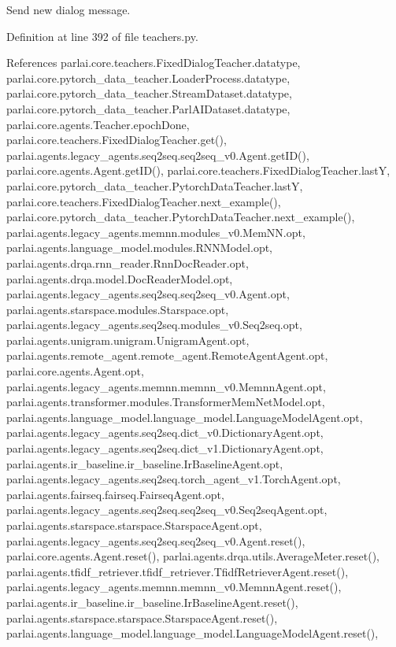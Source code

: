 \begin{DoxyVerb}Send new dialog message.\end{DoxyVerb}
 

Definition at line 392 of file teachers.\+py.



References parlai.\+core.\+teachers.\+Fixed\+Dialog\+Teacher.\+datatype, parlai.\+core.\+pytorch\+\_\+data\+\_\+teacher.\+Loader\+Process.\+datatype, parlai.\+core.\+pytorch\+\_\+data\+\_\+teacher.\+Stream\+Dataset.\+datatype, parlai.\+core.\+pytorch\+\_\+data\+\_\+teacher.\+Parl\+A\+I\+Dataset.\+datatype, parlai.\+core.\+agents.\+Teacher.\+epoch\+Done, parlai.\+core.\+teachers.\+Fixed\+Dialog\+Teacher.\+get(), parlai.\+agents.\+legacy\+\_\+agents.\+seq2seq.\+seq2seq\+\_\+v0.\+Agent.\+get\+I\+D(), parlai.\+core.\+agents.\+Agent.\+get\+I\+D(), parlai.\+core.\+teachers.\+Fixed\+Dialog\+Teacher.\+lastY, parlai.\+core.\+pytorch\+\_\+data\+\_\+teacher.\+Pytorch\+Data\+Teacher.\+lastY, parlai.\+core.\+teachers.\+Fixed\+Dialog\+Teacher.\+next\+\_\+example(), parlai.\+core.\+pytorch\+\_\+data\+\_\+teacher.\+Pytorch\+Data\+Teacher.\+next\+\_\+example(), parlai.\+agents.\+legacy\+\_\+agents.\+memnn.\+modules\+\_\+v0.\+Mem\+N\+N.\+opt, parlai.\+agents.\+language\+\_\+model.\+modules.\+R\+N\+N\+Model.\+opt, parlai.\+agents.\+drqa.\+rnn\+\_\+reader.\+Rnn\+Doc\+Reader.\+opt, parlai.\+agents.\+drqa.\+model.\+Doc\+Reader\+Model.\+opt, parlai.\+agents.\+legacy\+\_\+agents.\+seq2seq.\+seq2seq\+\_\+v0.\+Agent.\+opt, parlai.\+agents.\+starspace.\+modules.\+Starspace.\+opt, parlai.\+agents.\+legacy\+\_\+agents.\+seq2seq.\+modules\+\_\+v0.\+Seq2seq.\+opt, parlai.\+agents.\+unigram.\+unigram.\+Unigram\+Agent.\+opt, parlai.\+agents.\+remote\+\_\+agent.\+remote\+\_\+agent.\+Remote\+Agent\+Agent.\+opt, parlai.\+core.\+agents.\+Agent.\+opt, parlai.\+agents.\+legacy\+\_\+agents.\+memnn.\+memnn\+\_\+v0.\+Memnn\+Agent.\+opt, parlai.\+agents.\+transformer.\+modules.\+Transformer\+Mem\+Net\+Model.\+opt, parlai.\+agents.\+language\+\_\+model.\+language\+\_\+model.\+Language\+Model\+Agent.\+opt, parlai.\+agents.\+legacy\+\_\+agents.\+seq2seq.\+dict\+\_\+v0.\+Dictionary\+Agent.\+opt, parlai.\+agents.\+legacy\+\_\+agents.\+seq2seq.\+dict\+\_\+v1.\+Dictionary\+Agent.\+opt, parlai.\+agents.\+ir\+\_\+baseline.\+ir\+\_\+baseline.\+Ir\+Baseline\+Agent.\+opt, parlai.\+agents.\+legacy\+\_\+agents.\+seq2seq.\+torch\+\_\+agent\+\_\+v1.\+Torch\+Agent.\+opt, parlai.\+agents.\+fairseq.\+fairseq.\+Fairseq\+Agent.\+opt, parlai.\+agents.\+legacy\+\_\+agents.\+seq2seq.\+seq2seq\+\_\+v0.\+Seq2seq\+Agent.\+opt, parlai.\+agents.\+starspace.\+starspace.\+Starspace\+Agent.\+opt, parlai.\+agents.\+legacy\+\_\+agents.\+seq2seq.\+seq2seq\+\_\+v0.\+Agent.\+reset(), parlai.\+core.\+agents.\+Agent.\+reset(), parlai.\+agents.\+drqa.\+utils.\+Average\+Meter.\+reset(), parlai.\+agents.\+tfidf\+\_\+retriever.\+tfidf\+\_\+retriever.\+Tfidf\+Retriever\+Agent.\+reset(), parlai.\+agents.\+legacy\+\_\+agents.\+memnn.\+memnn\+\_\+v0.\+Memnn\+Agent.\+reset(), parlai.\+agents.\+ir\+\_\+baseline.\+ir\+\_\+baseline.\+Ir\+Baseline\+Agent.\+reset(), parlai.\+agents.\+starspace.\+starspace.\+Starspace\+Agent.\+reset(), parlai.\+agents.\+language\+\_\+model.\+language\+\_\+model.\+Language\+Model\+Agent.\+reset(), 